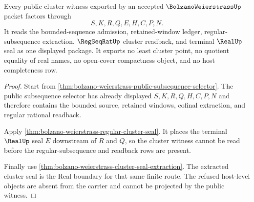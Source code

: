 \begin{theorem}
\label{thm:bolzano-weierstrass-public-cluster-witness}
Every public cluster witness exported by an accepted $\BolzanoWeierstrassUp$ packet factors through
$$
S,K,R,Q,E,H,C,P,N .
$$
It reads the bounded-sequence admission, retained-window ledger, regular-subsequence extraction, $\RegSeqRatUp$ cluster readback, and terminal $\RealUp$ seal as one displayed package. It exports no least cluster point, no quotient equality of real names, no open-cover compactness object, and no host completeness row.
\end{theorem}
\begin{proof}
Start from \autoref{thm:bolzano-weierstrass-public-subsequence-selector}. The public subsequence selector has already displayed $S,K,R,Q,H,C,P,N$ and therefore contains the bounded source, retained windows, cofinal extraction, and regular rational readback.

Apply \autoref{thm:bolzano-weierstrass-regular-cluster-seal}. It places the terminal $\RealUp$ seal $E$ downstream of $R$ and $Q$, so the cluster witness cannot be read before the regular-subsequence and readback rows are present.

Finally use \autoref{thm:bolzano-weierstrass-cluster-seal-extraction}. The extracted cluster seal is the Real boundary for that same finite route. The refused host-level objects are absent from the carrier and cannot be projected by the public witness.
\end{proof}


